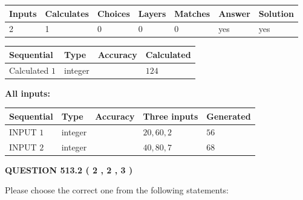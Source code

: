\documentclass[12pt]{article}
\begin{document}
 
\noindent{}
 
 

 
   
   
   
   
\noindent\begin{tabular}{|l|l|l|l|l|l|l|}
 \hline
Inputs & Calculates & Choices & Layers & Matches & Answer & Solution \\ \hline
 2  & 
 1  & 
 0
  & 
 0  & 
 0  & 
  yes & 
  yes 
  \\ \hline
 \end{tabular}
   
   
   
   
\noindent{}
   
   
  
  
\noindent\begin{tabular}{|l|l|l|l|}
\hline
 Sequential & Type & Accuracy & Calculated \\ 
\hline
 
 
  Calculated $  1 $ & integer &  & 
  $ 124 $ 
 \\  \hline  
 \end{tabular}
   
   
   
   
\noindent\vspace{0.1in}\hspace{-0.08in} {\textbf{\Large{All inputs: }}}
   
   
  
  
\noindent\begin{tabular}{|l|l|l|l|l|}
\hline
 Sequential & Type & Accuracy & Three inputs & Generated \\ 
\hline
 
 
  INPUT $  1 $ & integer &  & $
 20
 , 
 60
 , 
 2
 $ & $ 56 $ 
 \\  \hline  
 
 
  INPUT $  2 $ & integer &  & $
 40
 , 
 80
 , 
 7
 $ & $ 68 $ 
 \\  \hline  
 \end{tabular}
   
   
  
\vspace{0.2in}
  
{\textbf{\Large{QUESTION
513.2 
 ( 2 , 2 , 3 )
}}}
  
  
Please choose the correct one from the following statements:
 
\end{document}
